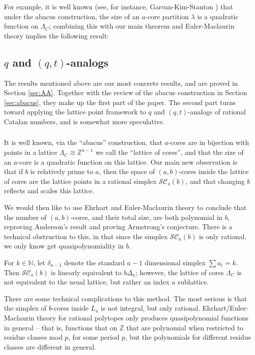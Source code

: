 \documentclass{amsart}[12pt]
\theoremstyle{definition}
\newcommand{\Z}{\mathbb{Z}}
\newcommand{\N}{\mathbb{N}}
\newcommand{\SC}{\mathcal{SC}}
\begin{document}
For example, it is well known (see, for instance, Garvan-Kim-Stanton \cite{GKS}) that under the abacus construction, the size of an $a$-core partition $\lambda$ is a quadratic function on $\Lambda_C$; combining this with our main theorem and Euler-Maclaurin theory implies the following result: 


\subsection{$q$ and $(q,t)$-analogs}
The results mentioned above are our most concrete results, and are proved in Section \ref{sec:AA}.   Together with the review of the abacus construction in Section \ref{sec:abacus}, they make up the first part of the paper.  The second part turns toward applying the lattice point framework to $q$ and $(q,t)$-analogs of rational Catalan numbers, and is somewhat more speculative.




\subsubsection{}




It is well known, via the ``abacus'' construction, that $a$-cores are
in bijection with points in a lattice $\Lambda_C\cong\Z^{a-1}$ we call the
``lattice of cores'', and that the size of an $a$-core is a quadratic function on this lattice.  Our main new observation is that if $b$ is relatively
prime to $a$, then the space of $(a,b)$-cores inside the
lattice of cores are the lattice points in a rational simplex $\SC_a(b)$, and that changing $b$ reflects and scales this lattice.  

We would then like to use Ehrhart and Euler-Maclaurin theory to conclude that the number of $(a,b)$-cores, and their total size, are both polynomial in $b$, reproving Anderson's result and proving Armstrong's conjecture.  There is a technical obstruction to this, in that since the simplex $\SC_a(b)$ is only rational, we only know get quasipolynomiality in $b$.


For $k\in\N$, let $\delta_{a-1}$ denote the
standard $a-1$ dimensional simplex $\sum a_i=k$.  Then $\SC_a(b)$ is
linearly equivalent to $b\Delta_a$; however, the lattice of cores
$\Lambda_C$ is not equivalent to the usual lattice, but rather an
index $a$ sublattice.




There are some technical complications to this method.  The most serious is that the simplex of $b$-cores inside $L_a$ is not integral,
but only rational.  Ehrhart/Euler-Maclaurin theory for
rational polytopes only produces quasipolynomial functions in general -- that
is, functions that on $\Z$ that are polynomial when restricted to
residue classes mod $p$, for some period $p$, but the polynomials for different residue classes are different in general.
\end{document}
